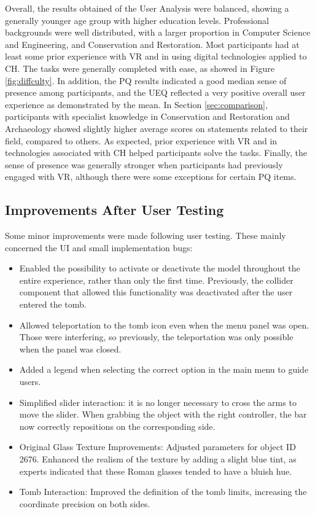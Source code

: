 Overall, the results obtained of the User Analysis were balanced, showing a generally younger age group with higher education levels. Professional backgrounds were well distributed, with a larger proportion in Computer Science and Engineering, and Conservation and Restoration.
Most participants had at least some prior experience with \gls{VR} and in using digital technologies applied to \gls{CH}. The tasks were generally completed with ease, as showed in Figure \ref{fig:diffculty}. In addition, the \gls{PQ} results indicated a good median sense of presence among participants, and the \gls{UEQ} reflected a very positive overall user experience as demonstrated by the mean.
In Section \ref{sec:comparison}, participants with specialist knowledge in Conservation and Restoration and Archaeology showed slightly higher average scores on statements related to their field, compared to others. As expected, prior experience with \gls{VR} and in technologies associated with \gls{CH} helped participants solve the tasks.
Finally, the sense of presence was generally stronger when participants had previously engaged with \gls{VR}, although there were some exceptions for certain \gls{PQ} items.

\subsection{Improvements After User Testing}
\label{sec:improvements}

Some minor improvements were made following user testing. These mainly concerned the \gls{UI} and small implementation bugs:

\begin{itemize}
 \item Enabled the possibility to activate or deactivate the model throughout the entire experience, rather than only the first time. Previously, the collider component that allowed this functionality was deactivated after the user entered the tomb.
 \item Allowed teleportation to the tomb icon even when the menu panel was open. Those were interfering, so previously, the teleportation was only possible when the panel was closed.
 \item Added a legend when selecting the correct option in the main menu to guide users.
 \item Simplified slider interaction: it is no longer necessary to cross the arms to move the slider. When grabbing the object with the right controller, the bar now correctly repositions on the corresponding side.
 \item Original Glass Texture Improvements: Adjusted parameters for object ID 2676. Enhanced the realism of the texture by adding a slight blue tint, as experts indicated that these Roman glasses tended to have a bluish hue.
 \item Tomb Interaction: Improved the definition of the tomb limits, increasing the coordinate precision on both sides.
\end{itemize}

